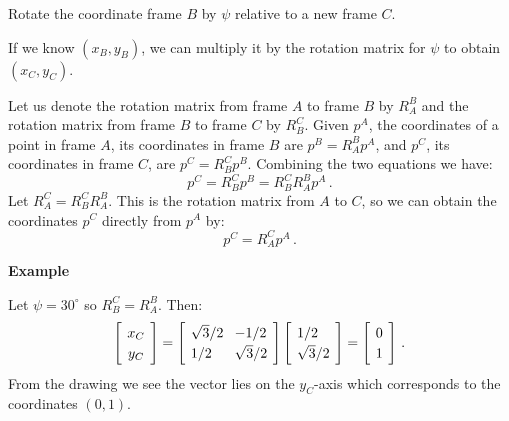 \documentclass[11pt,a4paper]{report}
\newcommand*{\spacearray}{
\renewcommand{\arraystretch}{1.2}
\setlength{\arraycolsep}{4pt}
}
\begin{document}
Rotate the coordinate frame $B$ by $\psi$ relative to a new frame $C$.
\begin{center}
\end{center}
If we know $(x_B,y_B)$, we can multiply it by the rotation matrix for $\psi$ to obtain $(x_C,y_C)$.

Let us denote the rotation matrix from frame $A$ to frame $B$ by $R^B_A$ and the rotation matrix from frame $B$ to frame $C$ by $R^C_B$. Given $p^A$, the coordinates of a point in frame $A$, its coordinates in frame $B$ are $p^B=R^B_A p^A$, and $p^C$, its coordinates in frame $C$, are $p^C=R^C_B p^B$. Combining the two equations we have:
\[
p^C = R^C_B p^B = R^C_B R^B_A p^A\,.
\]
Let $R^C_A = R^C_B R^B_A$. This is the rotation matrix from $A$ to $C$, so we can obtain the coordinates $p^C$ directly from $p^A$ by:
\[
p^C = R^C_A p^A\,.
\]

\pagebreak[3]

\textbf{Example}

Let $\psi=30^\circ$ so $R^C_B=R^B_A$. Then:
\begin{displaymath}
\spacearray
\left[ 
\begin{array}{c} x_C\\ y_C \end{array}
\right] = 
\left[\begin{array}{l} \sqrt{3}/2 \\ 1/2 \end{array}\\
\begin{array}{l} -1/2 \\ \sqrt{3}/2 \end{array}\\
\right]
\left[\begin{array}{l} 1/2 \\ \sqrt{3}/2 \end{array}\\ \right] =
\left[\begin{array}{l} 0 \\ 1 \end{array}\\ \right]\,.
\end{displaymath}
From the drawing we see the vector lies on the $y_C$-axis which corresponds to the coordinates $(0,1)$.
\end{document}
